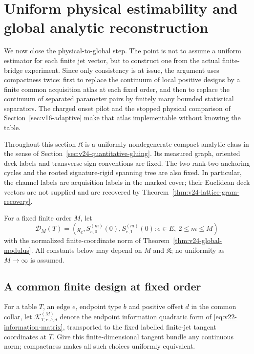 \section{Uniform physical estimability and global analytic reconstruction}
\label{sec:v24-uniform-physical-global}

We now close the physical-to-global step.  The point is not to assume a
uniform estimator for each finite jet vector, but to construct one from the
actual finite-bridge experiment.  Since only consistency is at issue, the
argument uses compactness twice: first to replace the continuum of local
positive designs by a finite common acquisition atlas at each fixed order,
and then to replace the continuum of separated parameter pairs by finitely
many bounded statistical separators.  The charged onset pilot and the stopped
physical comparison of Section~\ref{sec:v16-adaptive} make that atlas
implementable without knowing the table.

Throughout this section \(\mathfrak K\) is a uniformly nondegenerate compact
analytic class in the sense of
Section~\ref{sec:v24-quantitative-gluing}.  Its measured graph, oriented deck
labels and transverse sign conventions are fixed.  The two rank-two anchoring
cycles and the rooted signature-rigid spanning tree are also fixed.  In
particular, the channel labels are acquisition labels in the marked cover;
their Euclidean deck vectors are not supplied and are recovered by
Theorem~\ref{thm:v24-lattice-gram-recovery}.

For a fixed finite order \(M\), let
\[
 \mathcal D_M(T)=
 \left(g_e,S_{e,0}^{(m)}(0),S_{e,1}^{(m)}(0):
       e\in E,\ 2\le m\le M\right)
\]
with the normalized finite-coordinate norm of
Theorem~\ref{thm:v24-global-modulus}.  All constants below may depend on
\(M\) and \(\mathfrak K\); no uniformity as \(M\to\infty\) is assumed.

\subsection{A common finite design at fixed order}

For a table \(T\), an edge \(e\), endpoint type \(b\) and positive offset
\(d\) in the common collar, let \(\mathcal K_{T,e,b,d}^{(M)}\) denote the
endpoint information quadratic form of
\eqref{eq:v22-information-matrix}, transported to the fixed labelled
finite-jet tangent coordinates at \(T\).  Give this finite-dimensional tangent
bundle any continuous norm; compactness makes all such choices uniformly
equivalent.

